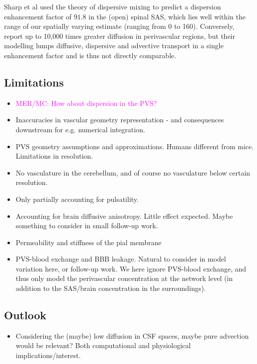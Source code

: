 \documentclass[fleqn,10pt]{wlscirep}
\newcommand{\mer}[1]{\textcolor{magenta}{#1}}
\begin{document}
Sharp et al used the theory of dispersive mixing to predict a dispersion enhancement factor of $91.8$ in the (open) spinal SAS, which lies well within the range of our spatially varying estimate (ranging from 0 to 160). Conversely, \cite{ray2021quantitative} report up to 10,000 times greater diffusion in perivascular regions, but their modelling lumps diffusive, dispersive and advective transport in a single enhancement factor and is thus not directly comparable.



\subsection*{Limitations}

\begin{itemize}
\item
  \mer{MER/MC: How about dispersion in the PVS?}
\item 
  Inaccuracies in vascular geometry representation - and consequences downstream for e.g. numerical integration.
\item
  PVS geometry assumptions and approximations. Humans different from mice. Limitations in resolution.
\item
  No vasculature in the cerebellum, and of course no vasculature below certain resolution.
\item
  Only partially accounting for pulsatility. 
\item
  Accounting for brain diffusive anisotropy. Little effect expected. Maybe something to consider in small follow-up work.
\item
  Permeability and stiffness of the pial membrane
\item
  PVS-blood exchange and BBB leakage. Natural to consider in model variation here, or follow-up work. We here ignore PVS-blood exchange, and thus only model the perivascular concentration at the network level (in addition to the SAS/brain concentration in the surroundings).

\end{itemize}

\subsection*{Outlook}

\begin{itemize}
\item
  Considering the (maybe) low diffusion in CSF spaces, maybe pure
  advection would be relevant? Both computational and physiological
  implications/interest.
\end{itemize}
\end{document}
